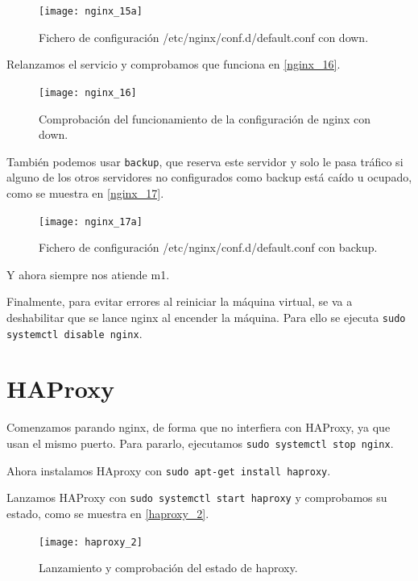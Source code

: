\begin{figure}[h!]
\begin{center}
\caption{Fichero de configuración /etc/nginx/conf.d/default.conf con down.}
\label{nginx_15}
\texttt{[image: nginx\_15a]}
\end{center}
\end{figure}

Relanzamos el servicio y comprobamos que funciona en \eqref{nginx_16}.

\begin{figure}[h!]
\begin{center}
\caption{Comprobación del funcionamiento de la configuración de nginx con down.}
\label{nginx_16}
\texttt{[image: nginx\_16]}
\end{center}
\end{figure}

También podemos usar \verb|backup|, que reserva este servidor y solo le pasa tráfico si alguno de los otros servidores no configurados como backup está caído u ocupado, como se muestra en \eqref{nginx_17}.

\begin{figure}[h!]
\begin{center}
\caption{Fichero de configuración /etc/nginx/conf.d/default.conf con backup.}
\label{nginx_17}
\texttt{[image: nginx\_17a]}
\end{center}
\end{figure}

Y ahora siempre nos atiende m1.

Finalmente, para evitar errores al reiniciar la máquina virtual, se va a deshabilitar que se lance nginx al encender la máquina. Para ello se ejecuta \verb|sudo systemctl disable nginx|.

\chapter{HAProxy}

Comenzamos parando nginx, de forma que no interfiera con HAProxy, ya que usan el mismo puerto. Para pararlo, ejecutamos \verb|sudo systemctl stop nginx|.

Ahora instalamos HAproxy con \verb|sudo apt-get install haproxy|.

Lanzamos HAProxy con \verb|sudo systemctl start haproxy| y comprobamos su estado, como se muestra en \eqref{haproxy_2}.

\begin{figure}[h!]
\begin{center}
\caption{Lanzamiento y comprobación del estado de haproxy.}
\label{haproxy_2}
\texttt{[image: haproxy\_2]}
\end{center}
\end{figure}

